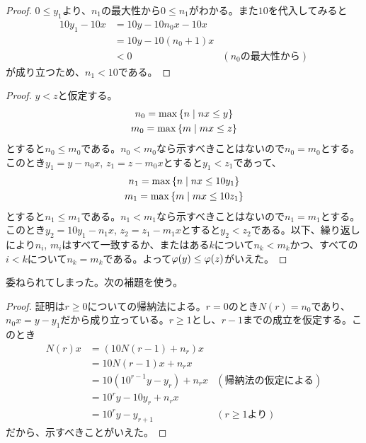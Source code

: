 \begin{proof}
  $0 \leq y_1$より、$n_1$の最大性から$0 \leq n_1$がわかる。また$10$を代入してみると
  \begin{align*}
    10y_1 - 10x &= 10y - 10n_0x - 10 x \\
    &= 10y - 10(n_0 + 1)x \\
    &< 0 &(n_0\text{の最大性から})
  \end{align*}
  が成り立つため、$n_1 < 10$である。
\end{proof}



\begin{proof}
  $y < z$と仮定する。
  \begin{gather*}
    n_0 = \max\left\{ n \mathrel{} \middle| \mathrel{} nx \leq y \right\} \\
    m_0 = \max\left\{ m \mathrel{} \middle| \mathrel{} mx \leq z \right\}
  \end{gather*}
  とすると$n_0 \leq m_0$である。$n_0 < m_0$なら示すべきことはないので$n_0 = m_0$とする。このとき$y_1 = y - n_0x$, $z_1 =z - m_0 x $とすると$y_1 < z_1$であって、
  \begin{gather*}
    n_1 = \max\left\{ n \mathrel{} \middle| \mathrel{} nx \leq 10y_1 \right\} \\
    m_1 = \max\left\{ m \mathrel{} \middle| \mathrel{} mx \leq 10z_1 \right\}
  \end{gather*}
  とすると$n_1 \leq m_1$である。$n_1 < m_1$なら示すべきことはないので$n_1 = m_1$とする。このとき$y_2 = 10y_1 - n_1x$, $z_2 =z_1 - m_1 x $とすると$y_2 < z_2$である。以下、繰り返しにより$n_i$, $m_i$はすべて一致するか、またはある$k$について$n_k < m_k$かつ、すべての$i<k$について$n_k = m_k$である。よって${\varphi}(y) \leq {\varphi}(z)$がいえた。
\end{proof}


\begin{rem}
  委ねられてしまった。次の補題を使う。
\end{rem}

\begin{proof}
  証明は$r \geq 0$についての帰納法による。$r=0$のとき$N(r)=n_0$であり、$n_0x=y-y_1$だから成り立っている。$r \geq 1$とし、$r-1$までの成立を仮定する。このとき
  \begin{align*}
    N(r)x &= (10N(r-1) + n_r)x \\
    &= 10N(r-1)x + n_rx \\
    &= 10(10^{r-1}y -y_r) + n_rx &(\text{帰納法の仮定による}) \\
    &= 10^r y - 10 y_r + n_r x \\
    &= 10^r y - y_{r+1} &(r \geq 1\text{より})
  \end{align*}
  だから、示すべきことがいえた。
\end{proof}

